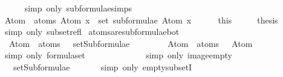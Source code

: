 \begin{isabellebody}
\ \ \ \ \isamarkupfalse%
\ {\isacharparenleft}simp\ only{\isacharcolon}\ subformulae{\isachardot}simps{\isacharparenleft}{}{\isacharparenright}{\isacharparenright}\isanewline
\ \ \isamarkupfalse%
\ \isamarkupfalse%
\ {\isachardoublequoteopen}Atom\ {\isacharbackquote}\ atoms\ {\isacharparenleft}Atom\ x{\isacharparenright}\ {\isacharequal}\ set\ {\isacharparenleft}subformulae\ {\isacharparenleft}Atom\ x{\isacharparenright}{\isacharparenright}{\isachardoublequoteclose}\isanewline
\ \ \ \ \isamarkupfalse%
\ this\isanewline
\ \ \isamarkupfalse%
\ \isamarkupfalse%
\ {\isacharquery}thesis\ \isanewline
\ \ \ \ \isamarkupfalse%
\ {\isacharparenleft}simp\ only{\isacharcolon}\ subset{\isacharunderscore}refl{\isacharparenright}\isanewline
{}\isamarkupfalse%
%
\endisatagproof
{\isafoldproof}%
%
\isadelimproof
\isanewline
%
\endisadelimproof
\isanewline
{}\isamarkupfalse%
\ atoms{\isacharunderscore}are{\isacharunderscore}subformulae{\isacharunderscore}bot{\isacharcolon}\ \isanewline
\ \ {\isachardoublequoteopen}Atom\ {\isacharbackquote}\ atoms\ {\isasymbottom}\ {\isasymsubseteq}\ setSubformulae\ {\isasymbottom}{\isachardoublequoteclose}\ \ \isanewline
%
\isadelimproof
%
\endisadelimproof
%
\isatagproof
{}\isamarkupfalse%
\ {\isacharminus}\isanewline
\ \ \isamarkupfalse%
\ {\isachardoublequoteopen}Atom\ {\isacharbackquote}\ atoms\ {\isasymbottom}\ {\isacharequal}\ Atom\ {\isacharbackquote}\ {\isasymemptyset}{\isachardoublequoteclose}\isanewline
\ \ \ \ \isamarkupfalse%
\ {\isacharparenleft}simp\ only{\isacharcolon}\ formula{\isachardot}set{\isacharparenleft}{}{\isacharparenright}{\isacharparenright}\isanewline
\ \ \isamarkupfalse%
\ \isamarkupfalse%
\ {\isachardoublequoteopen}{\isasymdots}\ {\isacharequal}\ {\isasymemptyset}{\isachardoublequoteclose}\isanewline
\ \ \ \ \isamarkupfalse%
\ {\isacharparenleft}simp\ only{\isacharcolon}\ image{\isacharunderscore}empty{\isacharparenright}\isanewline
\ \ \isamarkupfalse%
\ \isamarkupfalse%
\ {\isachardoublequoteopen}{\isasymdots}\ {\isasymsubseteq}\ setSubformulae\ {\isasymbottom}{\isachardoublequoteclose}\isanewline
\ \ \ \ \isamarkupfalse%
\ {\isacharparenleft}simp\ only{\isacharcolon}\ empty{\isacharunderscore}subsetI{\isacharparenright}\isanewline
\ \ \isamarkupfalse%
\ \isamarkupfalse%

\end{isabellebody}
